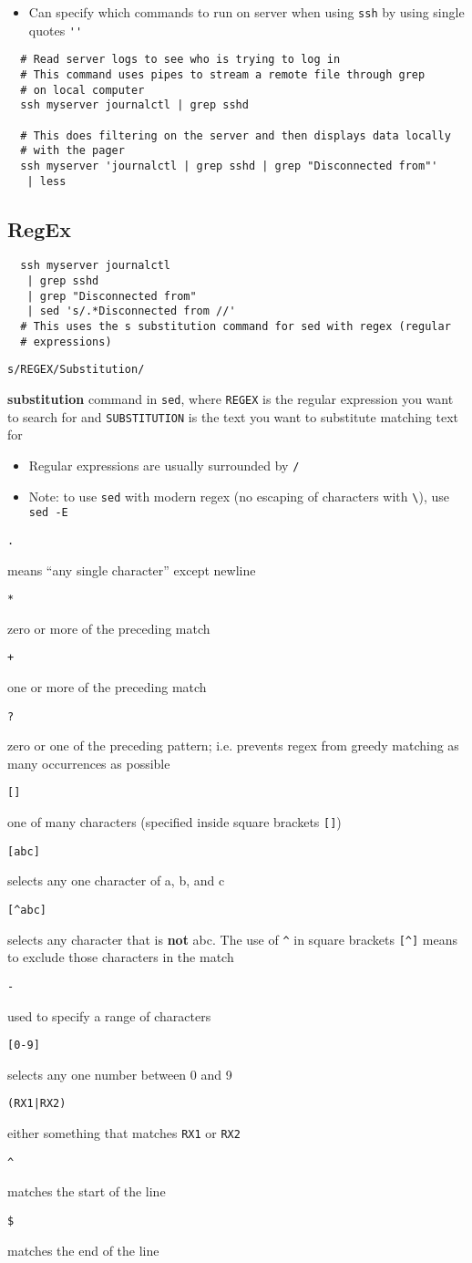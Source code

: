 \documentclass[letterpaper,12pt]{article}
\newcommand*{\lstitem}[1]{
  \setbox0\hbox{\lstinline{#1}}
  \item[\usebox0]
}
\begin{document}
\begin{itemize}
 \item Can specify which commands to run on server when using \lstinline{ssh} by using single quotes \lstinline{''}
\end{itemize}

\begin{lstlisting}
  # Read server logs to see who is trying to log in
  # This command uses pipes to stream a remote file through grep
  # on local computer
  ssh myserver journalctl | grep sshd

  # This does filtering on the server and then displays data locally
  # with the pager
  ssh myserver 'journalctl | grep sshd | grep "Disconnected from"'
   | less
\end{lstlisting}

\subsection{RegEx}

\begin{lstlisting}
  ssh myserver journalctl
   | grep sshd
   | grep "Disconnected from"
   | sed 's/.*Disconnected from //'
  # This uses the s substitution command for sed with regex (regular
  # expressions)
\end{lstlisting}

\begin{description}
 \lstitem{s/REGEX/Substitution/} \textbf{substitution} command in \lstinline{sed}, where \lstinline{REGEX} is the regular expression you want to search for and \lstinline{SUBSTITUTION} is the text you want to substitute matching text for
\end{description}

\begin{itemize}
 \item Regular expressions are usually surrounded by \lstinline{/}
 \item Note: to use \lstinline{sed} with modern regex (no escaping of characters with \lstinline{\}), use \lstinline{sed -E}
\end{itemize}

\begin{description}
 \lstitem{.} means “any single character” except newline
 \lstitem{*} zero or more of the preceding match
 \lstitem{+} one or more of the preceding match
 \lstitem{?} zero or one of the preceding pattern; i.e. prevents regex from greedy matching as many occurrences as possible
 \lstitem{[]} one of many characters (specified inside square brackets \lstinline{[]})
 \lstitem{[abc]} selects any one character of a, b, and c
 \lstitem{[^abc]} selects any character that is \textbf{not} abc. The use of \lstinline{^} in square brackets \lstinline{[^]} means to exclude those characters in the match
 \lstitem{-} used to specify a range of characters
 \lstitem{[0-9]} selects any one number between 0 and 9
 \lstitem{(RX1|RX2)} either something that matches \lstinline{RX1} or \lstinline{RX2}
 \lstitem{^} matches the start of the line
 \lstitem{$} matches the end of the line
\end{description}
\end{document}
